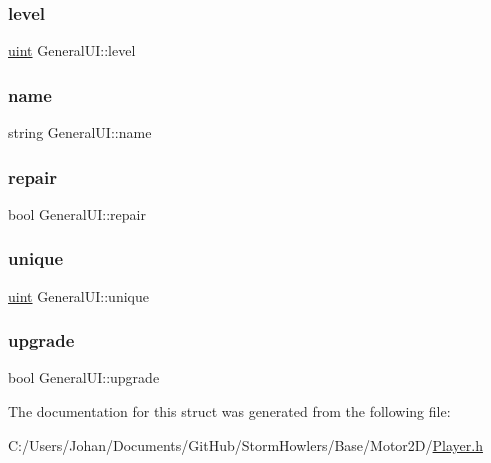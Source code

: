 \subsubsection{\texorpdfstring{level}{level}}
{\footnotesize\ttfamily \mbox{\hyperlink{_defs_8h_a91ad9478d81a7aaf2593e8d9c3d06a14}{uint}} General\+U\+I\+::level}

\mbox{\label{struct_general_u_i_a31960639cc6a992ae6a2e23c8931c447}} 
\subsubsection{\texorpdfstring{name}{name}}
{\footnotesize\ttfamily string General\+U\+I\+::name}

\mbox{\label{struct_general_u_i_a5a70fedd549c4ff917675581d4bf1b1b}} 
\subsubsection{\texorpdfstring{repair}{repair}}
{\footnotesize\ttfamily bool General\+U\+I\+::repair}

\mbox{\label{struct_general_u_i_adc0614033f612f2c6120cd2fc011ecbd}} 
\subsubsection{\texorpdfstring{unique}{unique}}
{\footnotesize\ttfamily \mbox{\hyperlink{_defs_8h_a91ad9478d81a7aaf2593e8d9c3d06a14}{uint}} General\+U\+I\+::unique}

\mbox{\label{struct_general_u_i_a8b88aa193d1e1baa9db18fd3c393f727}} 
\subsubsection{\texorpdfstring{upgrade}{upgrade}}
{\footnotesize\ttfamily bool General\+U\+I\+::upgrade}



The documentation for this struct was generated from the following file\+:\begin{DoxyCompactItemize}
\item 
C\+:/\+Users/\+Johan/\+Documents/\+Git\+Hub/\+Storm\+Howlers/\+Base/\+Motor2\+D/\mbox{\hyperlink{_player_8h}{Player.\+h}}\end{DoxyCompactItemize}
